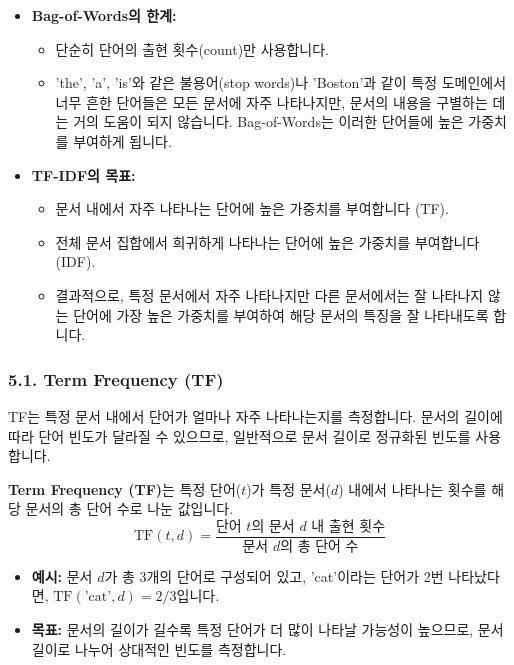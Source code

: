 \documentclass[11pt,a4paper]{article}
\theoremstyle{definition}
\begin{document}
\begin{itemize}
    \item \textbf{Bag-of-Words의 한계:}
    \begin{itemize}
        \item 단순히 단어의 출현 횟수(count)만 사용합니다.
        \item 'the', 'a', 'is'와 같은 불용어(stop words)나 'Boston'과 같이 특정 도메인에서 너무 흔한 단어들은 모든 문서에 자주 나타나지만, 문서의 내용을 구별하는 데는 거의 도움이 되지 않습니다. Bag-of-Words는 이러한 단어들에 높은 가중치를 부여하게 됩니다.
    \end{itemize}
    \item \textbf{TF-IDF의 목표:}
    \begin{itemize}
        \item 문서 내에서 자주 나타나는 단어에 높은 가중치를 부여합니다 (TF).
        \item 전체 문서 집합에서 희귀하게 나타나는 단어에 높은 가중치를 부여합니다 (IDF).
        \item 결과적으로, 특정 문서에서 자주 나타나지만 다른 문서에서는 잘 나타나지 않는 단어에 가장 높은 가중치를 부여하여 해당 문서의 특징을 잘 나타내도록 합니다.
    \end{itemize}
\end{itemize}

\subsubsection{5.1. Term Frequency (TF)}
TF는 특정 문서 내에서 단어가 얼마나 자주 나타나는지를 측정합니다. 문서의 길이에 따라 단어 빈도가 달라질 수 있으므로, 일반적으로 문서 길이로 정규화된 빈도를 사용합니다.

\begin{tcolorbox}[definitionbox, title=Term Frequency (TF) 정의]
\textbf{Term Frequency (TF)}는 특정 단어($t$)가 특정 문서($d$) 내에서 나타나는 횟수를 해당 문서의 총 단어 수로 나눈 값입니다.
$$ \text{TF}(t, d) = \frac{\text{단어 } t \text{의 문서 } d \text{ 내 출현 횟수}}{\text{문서 } d \text{의 총 단어 수}} $$
\end{tcolorbox}

\begin{itemize}
    \item \textbf{예시:} 문서 $d$가 총 3개의 단어로 구성되어 있고, 'cat'이라는 단어가 2번 나타났다면, $\text{TF}(\text{'cat'}, d) = 2/3$입니다.
    \item \textbf{목표:} 문서의 길이가 길수록 특정 단어가 더 많이 나타날 가능성이 높으므로, 문서 길이로 나누어 상대적인 빈도를 측정합니다.
\end{itemize}
\end{document}
